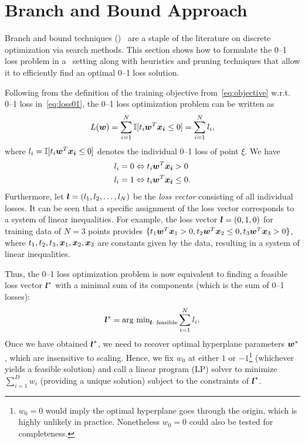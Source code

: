 \section{Branch and Bound Approach}
\label{cha:branchandbound}

Branch and bound techniques (\BB)~\cite{bandb} are a staple of the
literature on discrete optimization via search methods.  This section
shows how to formulate the 0--1 loss problem in a \BB\ setting along
with heuristics and pruning techniques that allow it to efficiently
find an optimal 0--1 loss solution.

Following from the definition of the training objective
from~\eqref{eq:objective} w.r.t. 0--1 loss in~\eqref{eq:loss01},
the 0--1 loss optimization problem can be written as
$$L(\boldsymbol{w}) = \sum_{i=1}^N \mathbb{I} [t_i \boldsymbol{w}^T \boldsymbol{x_i} \leq 0] = \sum_{i=1}^N l_i,$$ 
where $l_i =\mathbb{I} [t_i \boldsymbol{w}^T \boldsymbol{x_i} \leq 0]$ denotes the individual 0--1 loss of point $\xi$. We have
\[ \begin{split}
l_i = 0 &\Leftrightarrow t_i \boldsymbol{w}^T \boldsymbol{x_i} > 0 \\
l_i = 1 &\Leftrightarrow t_i \boldsymbol{w}^T \boldsymbol{x_i} \leq 0. \\
\end{split} \] 
Furthermore, let $\boldsymbol{l}=(l_1, l_2, \dots, l_N)$ be the \emph{loss vector}
consisting of all individual losses. It can be seen that a specific
assignment of the loss vector corresponds to a system of linear
inequalities. For example, the loss vector $\boldsymbol{l}=(0,1,0)$ for training
data of $N=3$ points provides 
$\{ t_1 \boldsymbol{w}^T \boldsymbol{x}_1 > 0, t_2 \boldsymbol{w}^T \boldsymbol{x}_2 \leq 0, t_3 \boldsymbol{w}^T \boldsymbol{x}_3 > 0 \}$, 
where $t_1, t_2, t_3, \boldsymbol{x}_1, \boldsymbol{x}_2, \boldsymbol{x}_3$ are constants given by the
data, resulting in a system of linear inequalities.

Thus, the 0--1 loss optimization problem is now equivalent to finding
a feasible loss vector $\boldsymbol{l}^*$ with a minimal sum of its components
(which is the sum of 0--1 losses):
\begin{equation}
\boldsymbol{l}^* = \text{arg min}_{\boldsymbol{l} : \text{ feasible}} \sum_{i=1}^N l_i. \label{eq:bb_obj}
\end{equation}
Once we have obtained $\boldsymbol{l}^*$, we need to recover optimal hyperplane
parameters $\boldsymbol{w}^*$, which are insensitive to scaling.  Hence, we fix
$w_0$ at either $1$ or $-1$\footnote{$w_0 = 0$ would imply the optimal
  hyperplane goes through the origin, which is highly unlikely in
  practice.  Nonetheless $w_0 = 0$ could also be tested for
  completeness.} (whichever yields a feasible solution) and call a
linear program (LP) solver to minimize $\sum_{i=1}^D w_i$ 
(providing a unique solution) subject to the constraints of $\boldsymbol{l}^*$.

